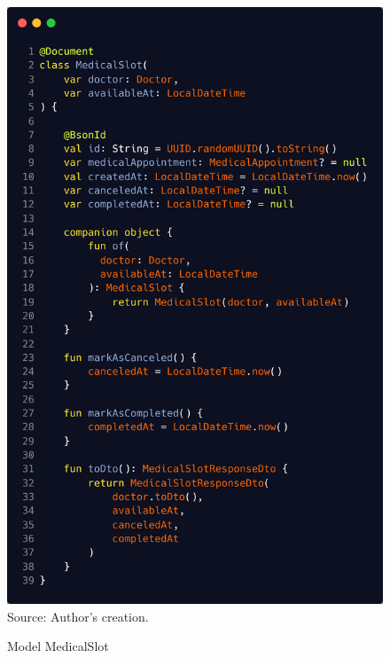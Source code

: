 \begin{figure}[HContext]
	\centering
	\caption{Model MedicalSlot}
	\includegraphics[width=0.85\linewidthContext]{figures/medical_slot}
	\label{fig:medicalslot}
	\\ \footnotesize Source: Author's creation.
\end{figure}


